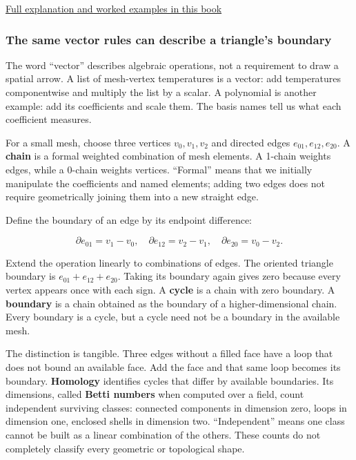 \hyperref[01-foundations-i-ch017-a-ruler-needs-more-than-coordinate-components]{Full explanation and worked examples in this book}

\subsubsection{The same vector rules can describe a triangle's boundary}\label{01-foundations-i-ch017-the-same-vector-rules-can-describe-a-triangles-boundary}

The word ``vector'' describes algebraic operations, not a requirement to draw a spatial arrow. A list of mesh-vertex temperatures is a vector: add temperatures componentwise and multiply the list by a scalar. A polynomial is another example: add its coefficients and scale them. The basis names tell us what each coefficient measures.

For a small mesh, choose three vertices \(v_0,v_1,v_2\) and directed edges \(e_{01},e_{12},e_{20}\). A \textbf{chain} is a formal weighted combination of mesh elements. A 1-chain weights edges, while a 0-chain weights vertices. ``Formal'' means that we initially manipulate the coefficients and named elements; adding two edges does not require geometrically joining them into a new straight edge.

Define the boundary of an edge by its endpoint difference:

\[
\partial e_{01}=v_1-v_0,\quad
\partial e_{12}=v_2-v_1,\quad
\partial e_{20}=v_0-v_2.
\]

Extend the operation linearly to combinations of edges. The oriented triangle boundary is \(e_{01}+e_{12}+e_{20}\). Taking its boundary again gives zero because every vertex appears once with each sign. A \textbf{cycle} is a chain with zero boundary. A \textbf{boundary} is a chain obtained as the boundary of a higher-dimensional chain. Every boundary is a cycle, but a cycle need not be a boundary in the available mesh.

The distinction is tangible. Three edges without a filled face have a loop that does not bound an available face. Add the face and that same loop becomes its boundary. \textbf{Homology} identifies cycles that differ by available boundaries. Its dimensions, called \textbf{Betti numbers} when computed over a field, count independent surviving classes: connected components in dimension zero, loops in dimension one, enclosed shells in dimension two. ``Independent'' means one class cannot be built as a linear combination of the others. These counts do not completely classify every geometric or topological shape.

